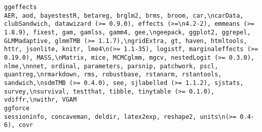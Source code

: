 \documentclass[
  letterpaper,
  DIV=11,
  numbers=noendperiod]{scrreprt}
\begin{document}
\begin{verbatim}
ggeffects                                                                                                                                                                                                                                                                                                                                                                                                                                                                                                                                                                                          AER, aod, bayestestR, betareg, brglm2, brms, broom, car,\ncarData, clubSandwich, datawizard (>= 0.9.0), effects (>=\n4.2-2), emmeans (>= 1.8.9), fixest, gam, gamlss, gamm4, gee,\ngeepack, ggplot2, ggrepel, GLMMadaptive, glmmTMB (>= 1.1.7),\ngridExtra, gt, haven, htmltools, httr, jsonlite, knitr, lme4\n(>= 1.1-35), logistf, marginaleffects (>= 0.19.0), MASS,\nMatrix, mice, MCMCglmm, mgcv, nestedLogit (>= 0.3.0), nlme,\nnnet, ordinal, parameters, parsnip, patchwork, pscl, quantreg,\nrmarkdown, rms, robustbase, rstanarm, rstantools, sandwich,\nsdmTMB (>= 0.4.0), see, sjlabelled (>= 1.1.2), sjstats, survey,\nsurvival, testthat, tibble, tinytable (>= 0.1.0), vdiffr,\nwithr, VGAM
ggforce                                                                                                                                                                                                                                                                                                                                                                                                                                                                                                                                                                                                                                                                                                                                                                                                                                                                                                                                                                                                                                                                                                                                                                                                                         sessioninfo, concaveman, deldir, latex2exp, reshape2, units\n(>= 0.4-6), covr

\end{verbatim}
\end{document}
